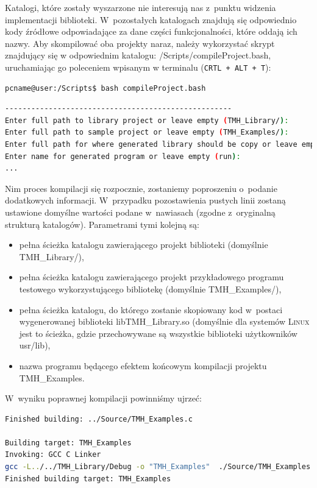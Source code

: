 Katalogi, które zostały wyszarzone nie interesują nas z~punktu widzenia implementacji biblioteki.
W~pozostałych katalogach znajdują się odpowiednio kody źródłowe odpowiadające za dane części funkcjonalności, które oddają ich nazwy.
Aby skompilować oba projekty naraz, należy wykorzystać skrypt znajdujący się w odpowiednim katalogu: \textsf{/Scripts/compileProject.bash}, uruchamiając go poleceniem wpisanym w terminalu (\texttt{CRTL + ALT + T}):

\begin{lstlisting}[language=bash]
pcname@user:/Scripts$ bash compileProject.bash
\end{lstlisting}

\small
\begin{lstlisting}[language=bash]
----------------------------------------------------
Enter full path to library project or leave empty (TMH_Library/):
Enter full path to sample project or leave empty (TMH_Examples/):
Enter full path for where generated library should be copy or leave empty (/usr/lib):
Enter name for generated program or leave empty (run):
...
\end{lstlisting}
\normalsize

Nim proces kompilacji się rozpocznie, zostaniemy poproszeniu o~podanie dodatkowych informacji.
W~przypadku pozostawienia pustych linii zostaną ustawione domyślne wartości podane w~nawiasach (zgodne z~oryginalną strukturą katalogów).
Parametrami tymi kolejną są:

\begin{itemize}
	\item pełna ścieżka katalogu zawierającego projekt biblioteki (domyślnie \textsf{TMH\_Library/}),
	\item pełna ścieżka katalogu zawierającego projekt przykładowego programu testowego wykorzystującego bibliotekę (domyślnie \textsf{TMH\_Examples/}),
	\item pełna ścieżka katalogu, do którego zostanie skopiowany kod w~postaci wygenerowanej biblioteki \textsf{libTMH\_Library.so} (domyślnie dla systemów \textsc{Linux} jest to ścieżka, gdzie przechowywane są wszystkie biblioteki użytkowników \textsf{usr/lib}),
	\item nazwa programu będącego efektem końcowym kompilacji projektu \textsf{TMH\_Examples}.
\end{itemize}

W~wyniku poprawnej kompilacji powinniśmy ujrzeć:

\small
\begin{lstlisting}[language=bash]
Finished building: ../Source/TMH_Examples.c
 
Building target: TMH_Examples
Invoking: GCC C Linker
gcc -L../../TMH_Library/Debug -o "TMH_Examples"  ./Source/TMH_Examples.o   -lTMH_Library
Finished building target: TMH_Examples
\end{lstlisting}
\normalsize

